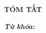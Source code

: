 \thispagestyle{empty}
\begin{center}
\fontsize{13pt}{1pt}\selectfont
    \textbf{TÓM TẮT}
\end{center}

\fontsize{13pt}{1pt}\selectfont



\textit{\textbf{Từ khóa:} }
